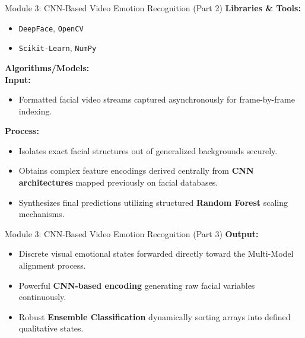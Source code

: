 \documentclass{beamer}
\begin{document}
\begin{frame}{Module 3: CNN-Based Video Emotion Recognition (Part 2)}
\textbf{Libraries \& Tools:}
\begin{itemize}
    \item \texttt{DeepFace}, \texttt{OpenCV}
    \item \texttt{Scikit-Learn}, \texttt{NumPy}
\end{itemize}

\vspace{0.3cm}
\textbf{Algorithms/Models:}
\\
\textbf{Input:}
\begin{itemize}
    \item Formatted facial video streams captured asynchronously for frame-by-frame indexing.
\end{itemize}

\textbf{Process:}
\begin{itemize}
    \item Isolates exact facial structures out of generalized backgrounds securely.
    \item Obtains complex feature encodings derived centrally from \textbf{CNN architectures} mapped previously on facial databases.
    \item Synthesizes final predictions utilizing structured \textbf{Random Forest} scaling mechanisms.
\end{itemize}
\end{frame}
\begin{frame}{Module 3: CNN-Based Video Emotion Recognition (Part 3)}
\textbf{Output:}
\begin{itemize}
    \item Discrete visual emotional states forwarded directly toward the Multi-Model alignment process.
\end{itemize}
\begin{itemize}
    \item Powerful \textbf{CNN-based encoding} generating raw facial variables continuously.
    \item Robust \textbf{Ensemble Classification} dynamically sorting arrays into defined qualitative states.
\end{itemize}
\end{frame}
\end{document}
